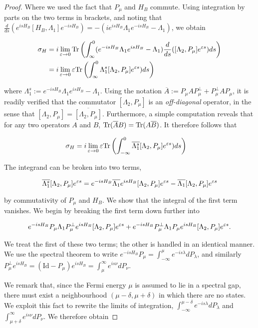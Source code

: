\documentclass[12pt, letterpaper]{article}
\begin{document}
\begin{proof}
Where we used the fact that $P_\mu$ and $H_B$ commute. Using integration by parts on the two terms in brackets, and noting that $\frac{d}{ds}(e^{isH_B}[H_B,\Lambda_1] e^{-isH_B}) = -(ie^{isH_B}\Lambda_1 e^{-isH_B} - \Lambda_1)$, we obtain

\[\begin{aligned}
\sigma_H &= i \lim_{\varepsilon\to 0}\text{Tr} \left( \int_{\infty}^0 (e^{-isH_B}\Lambda_1e^{isH_B} - \Lambda_1)\frac{d}{ds}([\Lambda_2, P_\mu] e^{\varepsilon s})ds\right)\\
&= i \lim_{\varepsilon\to 0}\varepsilon \text{Tr} \left( \int_{\infty}^0 \Lambda_1^s[\Lambda_2, P_\mu] e^{\varepsilon s})ds\right)\\
\end{aligned}\]

where $\Lambda_1^s := e^{-isH_B}\Lambda_1e^{isH_B} - \Lambda_1$. Using the notation $\overline{A} := P_\mu AP_\mu^\perp + P_\mu^\perp A P_\mu$, it is readily verified that the commutator $[\Lambda_2, P_\mu]$ is an \textit{off-diagonal} operator, in the sense that  $[\Lambda_2, P_\mu] = \overline{[\Lambda_2,P_\mu]}$. Furthermore, a simple computation reveals that for any two operators $A$ and $B$, $\text{Tr}(\overline{A}B) = \text{Tr}(A\overline{B})$. It therefore follows that

\[\begin{aligned}
\sigma_H &= i \lim_{\varepsilon\to 0}\varepsilon \text{Tr} \left( \int_{-\infty}^0 \overline{\Lambda_1^s}[\Lambda_2, P_\mu] e^{\varepsilon s})ds\right)
\end{aligned}\]

The integrand can be broken into two terms, 

\[\overline{\Lambda_1^s}[\Lambda_2, P_\mu] e^{\varepsilon s} = e^{-isH_B}\overline{\Lambda_1}e^{isH_B}[\Lambda_2, P_\mu]e^{\varepsilon s} - \overline{\Lambda_1}[\Lambda_2, P_\mu]e^{\varepsilon s}\]

by commutativity of $P_\mu$ and $H_B$. We show that the integral of the first term vanishes. We begin by breaking the first term down further into

\[e^{-isH_B}P_\mu \Lambda_1 P_\mu^\perp e^{isH_B}[\Lambda_2, P_\mu]e^{\varepsilon s} + e^{-isH_B}P_\mu^\perp \Lambda_1 P_\mu e^{isH_B}[\Lambda_2, P_\mu]e^{\varepsilon s}.\]

We treat the first of these two terms; the other is handled in an identical manner. We use the spectral theorem to write $e^{-isH_B}P_\mu = \int_{-\infty}^\mu e^{-is\lambda}dP_\lambda$, and similarly $P_\mu^\perp e^{isH_B} = (\text{Id} - P_\mu) e^{isH_B} = \int_\mu^\infty e^{is\nu} dP_\nu$. 

We remark that, since the Fermi energy $\mu$ is assumed to lie in a spectral gap, there must exist a neighbourhood $(\mu-\delta, \mu+\delta)$ in which there are no states. We exploit this fact to rewrite the limits of integration, $\int_{-\infty}^{\mu-\delta} e^{-is\lambda}dP_\lambda$ and $\int_{\mu+\delta}^\infty e^{is\nu} dP_\nu$. We therefore obtain


\end{proof}
\end{document}

